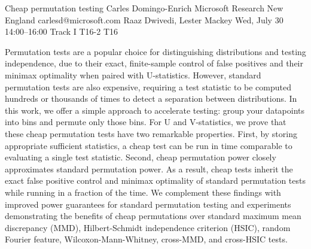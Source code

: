 \begin{talk}
  {Cheap permutation testing}%
  {Carles Domingo-Enrich}%
  {Microsoft Research New England}%
  {carlesd@microsoft.com}%
  {Raaz Dwivedi, Lester Mackey}%
  {}%
  {Wed, July 30 14:00–16:00 Track I}%
  {T16-2}%
  {T16}%
			
Permutation tests are a popular choice for distinguishing distributions and testing independence, due to their exact, finite-sample control of false positives and their minimax optimality when paired with U-statistics. However, standard permutation tests are also expensive, requiring a test statistic to be computed hundreds or thousands of times to detect a separation between distributions. In this work, we offer a simple approach to accelerate testing: group your datapoints into bins and permute only those bins. For U and V-statistics, we prove that these cheap permutation tests have two remarkable properties. First, by storing appropriate sufficient statistics, a cheap test can be run in time comparable to evaluating a single test statistic. Second, cheap permutation power closely approximates standard permutation power. As a result, cheap tests inherit the exact false positive control and minimax optimality of standard permutation tests while running in a fraction of the time. We complement these findings with improved power guarantees for standard permutation testing and experiments demonstrating the benefits of cheap permutations over standard maximum mean discrepancy (MMD), Hilbert-Schmidt independence criterion (HSIC), random Fourier feature, Wilcoxon-Mann-Whitney, cross-MMD, and cross-HSIC tests.



\end{talk}
